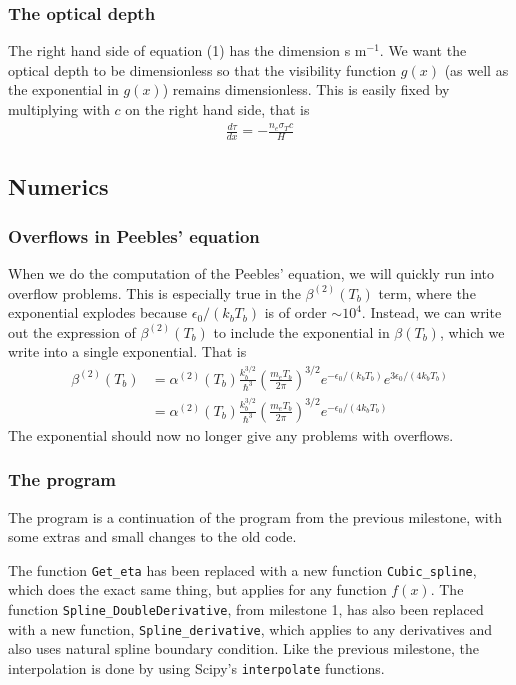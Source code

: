 \documentclass[12pt]{article}
\begin{document}
\subsubsection*{The optical depth}
The right hand side of equation (1) has the dimension s m$^{-1}$. We want the optical depth to be dimensionless so that the visibility function $g(x)$ (as well as the exponential in  $g(x)$) remains dimensionless. This is easily fixed by multiplying with $c$ on the right hand side, that is
\begin{align}
\frac{d\tau}{dx} = -\frac{n_e \sigma_T c}{H}
\end{align}
\subsection*{Numerics}
\subsubsection*{Overflows in Peebles' equation}
When we do the computation of the Peebles' equation, we will quickly run into overflow problems. This is especially true in the $\beta^{(2)}(T_b)$ term, where the exponential explodes because $\epsilon_0/(k_bT_b)$ is of order $\sim 10^4$. Instead, we can write out the expression of $\beta^{(2)}(T_b)$ to include the exponential in $\beta(T_b)$, which we write into a single exponential. That is
\begin{align}
\beta^{(2)}(T_b) &= \alpha^{(2)}(T_b)\frac{k_b^{3/2}}{\hbar^3}\left(\frac{m_e T_b}{2\pi}\right)^{3/2}e^{-\epsilon_0/(k_bT_b)}e^{3\epsilon_0/(4k_bT_b)} \nonumber \\
&= \alpha^{(2)}(T_b)\frac{k_b^{3/2}}{\hbar^3}\left(\frac{m_e T_b}{2\pi}\right)^{3/2}e^{-\epsilon_0/(4k_bT_b)}
\end{align}
The exponential should now no longer give any problems with overflows.
\subsubsection*{The program}
The program is a continuation of the program from the previous milestone, with some extras and small changes to the old code. 

The function \verb|Get_eta| has been replaced with a new function \verb|Cubic_spline|, which does the exact same thing, but applies for any function $f(x)$. The function \verb|Spline_DoubleDerivative|, from milestone 1, has also been replaced with a new function, \verb|Spline_derivative|, which applies to any derivatives and also uses natural spline boundary condition. Like the previous milestone, the interpolation is done by using Scipy's \verb|interpolate| functions.
\end{document}
